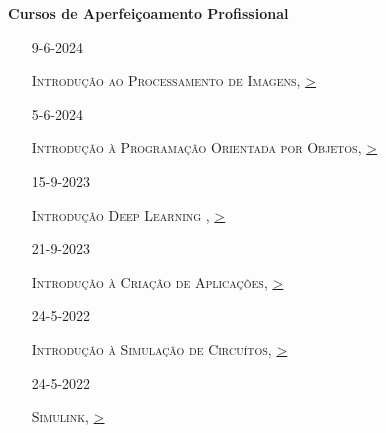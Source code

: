 \documentclass[10pt,a4paper,oneside]{article}
\newlength{\datewidth}
\newlength{\textindent}
\begin{document}
	\textbf{\hspace{\textindent}Cursos de Aperfeiçoamento Profissional}
	\begin{itemize}
\sloppy		
\item[\hspace{\datewidth}\scriptsize 9-6-2024] \parbox[t]{\dimexpr\linewidth-\datewidth-\textindent}{\textsc{Introdução ao Processamento de Imagens}, \href{https://matlabacademy.mathworks.com/progress/share/report.html?id=c9b24992-b614-48d2-a06f-0546c9d9d412&}{>}}
   
\item[\hspace{\datewidth}\scriptsize 5-6-2024] \parbox[t]{\dimexpr\linewidth-\datewidth-\textindent}{\textsc{Introdução à Programação Orientada por Objetos}, \href{https://matlabacademy.mathworks.com/progress/share/certificate.html?id=5cce993d-1378-4817-a016-cfdc909eef1f&}{>}}
       
\item[\hspace{\datewidth}\scriptsize 15-9-2023] \parbox[t]{\dimexpr\linewidth-\datewidth-\textindent}{\textsc{Introdução Deep Learning }, \href{https://matlabacademy.mathworks.com/progress/share/report.html?id=a773357e-1315-4d27-8bdc-ff2af04983a1&}{>}}

\item[\hspace{\datewidth}\scriptsize 21-9-2023] \parbox[t]{\dimexpr\linewidth-\datewidth-\textindent}{\textsc{Introdução à Criação de Aplicações}, \href{https://matlabacademy.mathworks.com/progress/share/report.html?id=8db10b82-5beb-4543-87c7-c8e13c5f7ccf&}{>}}

\item[\hspace{\datewidth}\scriptsize 24-5-2022] \parbox[t]{\dimexpr\linewidth-\datewidth-\textindent}{\textsc{Introdução à Simulação de Circuítos}, \href{https://matlabacademy.mathworks.com/progress/share/report.html?id=8e8b78c7-bd81-496c-b869-37bb71db1a39&}{>}}

\item[\hspace{\datewidth}\scriptsize 24-5-2022] \parbox[t]{\dimexpr\linewidth-\datewidth-\textindent}{\textsc{Simulink}, \href{https://matlabacademy.mathworks.com/progress/share/report.html?id=9a64293c-a2bd-48b0-b613-dc2d2b0ed99d&}{>}}
    
\end{itemize}
\end{document}
